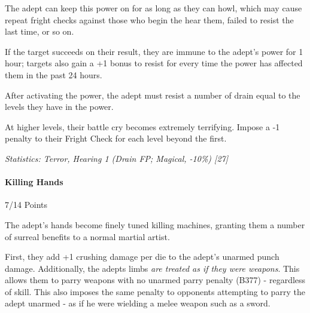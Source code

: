 \begin{multicols*}{3}
		The adept can keep this power on for as long as they can howl, which may cause repeat fright checks against those who begin the hear them, failed to resist the last time, or so on.
		
		If the target succeeds on their result, they are immune to the adept’s power for 1 hour; targets also gain a +1 bonus to resist for every time the power has affected them in the past 24 hours. 
		
		After activating the power, the adept must resist a number of drain equal to the levels they have in the power.
		
		At higher levels, their battle cry becomes extremely terrifying. Impose a -1 penalty to their Fright Check for each level beyond the first.

		\begin{center} 
			\begin{adjustwidth}{-0mm}{}
			\end{adjustwidth}
		\end{center}
	
		\textcolor{OliveGreen}{\textit{Statistics: Terror, Hearing 1 (Drain FP; Magical, -10\%) [27]}}
	
	\paragraph{Killing Hands}
	\begin{flushright}
		7/14 Points
	\end{flushright}

		The adept's hands become finely tuned killing machines, granting them a number of surreal benefits to a normal martial artist.
		
		First, they add +1 crushing damage per die to the adept's unarmed punch damage. Additionally, the adepts limbs \textit{are treated as if they were weapons}. This allows them to parry weapons with no unarmed parry penalty (B377) - regardless of skill. This also imposes the same penalty to opponents attempting to parry the adept unarmed - as if he were wielding a melee weapon such as a sword. 
		

\end{multicols*}
